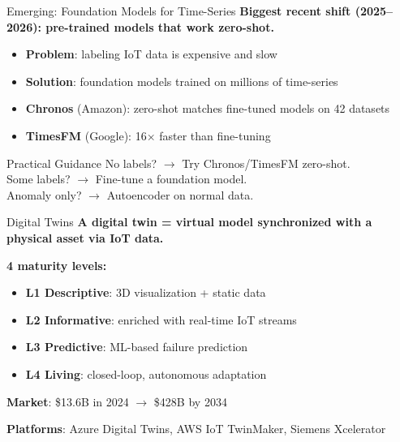\documentclass[aspectratio=169,11pt]{beamer}
\begin{document}
\begin{frame}{Emerging: Foundation Models for Time-Series}
    \textbf{Biggest recent shift (2025--2026): pre-trained models that work zero-shot.}

    \vspace{0.3cm}
    \begin{itemize}
        \item \textbf{Problem}: labeling IoT data is expensive and slow
        \item \textbf{Solution}: foundation models trained on millions of time-series
        \item \textbf{Chronos} (Amazon): zero-shot matches fine-tuned models on 42 datasets
        \item \textbf{TimesFM} (Google): 16$\times$ faster than fine-tuning
    \end{itemize}

    \vspace{0.3cm}
    \begin{alertblock}{Practical Guidance}
        No labels? $\rightarrow$ Try Chronos/TimesFM zero-shot.\\
        Some labels? $\rightarrow$ Fine-tune a foundation model.\\
        Anomaly only? $\rightarrow$ Autoencoder on normal data.
    \end{alertblock}
\end{frame}

\begin{frame}{Digital Twins}
    \textbf{A digital twin = virtual model synchronized with a physical asset via IoT data.}

    \vspace{0.3cm}
    \textbf{4 maturity levels:}
    \begin{itemize}
        \item \textbf{L1 Descriptive}: 3D visualization + static data
        \item \textbf{L2 Informative}: enriched with real-time IoT streams
        \item \textbf{L3 Predictive}: ML-based failure prediction
        \item \textbf{L4 Living}: closed-loop, autonomous adaptation
    \end{itemize}

    \vspace{0.3cm}
    \textbf{Market}: \$13.6B in 2024 $\rightarrow$ \$428B by 2034

    \vspace{0.2cm}
    \textbf{Platforms}: Azure Digital Twins, AWS IoT TwinMaker, Siemens Xcelerator
\end{frame}
\end{document}
